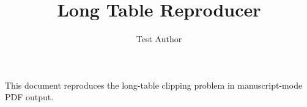 \documentclass[
  man,
  floatsintext,
  longtable,
  nolmodern,
  notxfonts,
  notimes,
  colorlinks=true,linkcolor=blue,citecolor=blue,urlcolor=blue]{apa7}
\title{Long Table Reproducer}
\author{Test Author}
\affiliation{
{Test University}}
\newlength{\cslhangindent}
\newlength{\csllabelwidth}
\begin{document}
\maketitle




\setlength\LTleft{0pt}



\ifdefined\Shaded\renewenvironment{Shaded}{\begin{snugshade}\begin{singlespace}}{\end{singlespace}\end{snugshade}}\fi


\ifdefined\cslhangindent\else\newlength{\cslhangindent}\fi
\ifdefined\csllabelwidth\else\newlength{\csllabelwidth}\fi
\setlength{\cslhangindent}{0.5in}


This document reproduces the long-table clipping problem in
manuscript-mode PDF output.
\end{document}
